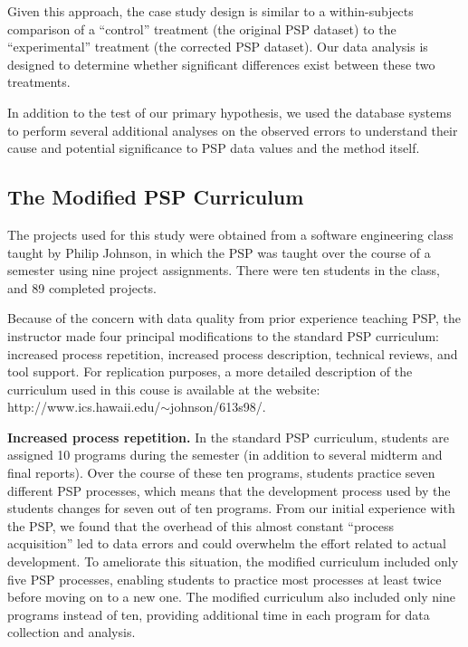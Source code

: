 Given this approach, the case study design is similar to a 
within-subjects comparison of a ``control'' treatment (the original PSP
dataset) to the ``experimental'' treatment (the corrected PSP dataset).
Our data analysis is designed to determine whether significant differences exist
between these two treatments. 

In addition to the test of our primary hypothesis, we used the database
systems to perform several additional analyses on the observed  errors to
understand their cause and potential significance to PSP data values and
the method itself.

\subsection{The Modified PSP Curriculum}
  
  The projects used for this study were obtained from a software
  engineering class taught by Philip Johnson, in which the PSP was taught
  over the course of a semester using nine project assignments. There were
  ten students in the class, and 89 completed projects.
   
  Because of the concern with data quality from prior experience teaching
  PSP, the instructor made four principal modifications to the standard PSP
  curriculum: increased process repetition,  increased process description,
  technical reviews, and tool support.  For replication purposes, a more
  detailed description of the curriculum used in this couse is available
  at the website: http://www.ics.hawaii.edu/$\sim$johnson/613s98/.
  
  {\bf Increased process repetition.} In the standard PSP curriculum,
  students are assigned 10 programs during the semester (in addition to
  several midterm and final reports). Over the course of these ten
  programs, students practice seven different PSP processes, which means
  that the development process used by the students changes for seven out
  of ten programs.  From our initial experience with the PSP, we found
  that the overhead of this almost constant ``process acquisition'' led to
  data errors and could overwhelm the effort related to actual development.
  To ameliorate this situation, the modified curriculum included only five
  PSP processes, enabling students to practice most
  processes at least twice before moving on to a new one. The modified
  curriculum also included only nine programs instead of ten, providing
  additional time in each program for data collection and analysis.
  
